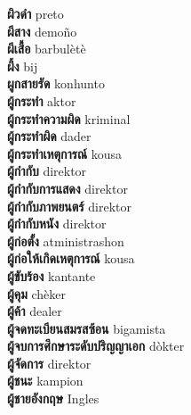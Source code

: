 \textbf{ ผิวดำ  } preto \\
\textbf{ ผีสาง  } demoño \\
\textbf{ ผีเสื้อ  } barbulètè \\
\textbf{ ผึ้ง  } bij \\
\textbf{ ผูกสายรัด  } konhunto \\
\textbf{ ผู้กระทำ  } aktor \\
\textbf{ ผู้กระทำความผิด  } kriminal \\
\textbf{ ผู้กระทำผิด  } dader \\
\textbf{ ผู้กระทำเหตุการณ์  } kousa \\
\textbf{ ผู้กำกับ  } direktor \\
\textbf{ ผู้กำกับการแสดง  } direktor \\
\textbf{ ผู้กำกับภาพยนตร์  } direktor \\
\textbf{ ผู้กำกับหนัง  } direktor \\
\textbf{ ผู้ก่อตั้ง  } atministrashon \\
\textbf{ ผู้ก่อให้เกิดเหตุการณ์  } kousa \\
\textbf{ ผู้ขับร้อง  } kantante \\
\textbf{ ผู้คุม  } chèker \\
\textbf{ ผู้ค้า  } dealer \\
\textbf{ ผู้จดทะเบียนสมรสซ้อน  } bigamista \\
\textbf{ ผู้จบการศึกษาระดับปริญญาเอก  } dòkter \\
\textbf{ ผู้จัดการ  } direktor \\
\textbf{ ผู้ชนะ  } kampion \\
\textbf{ ผู้ชายอังกฤษ  } Ingles \\
